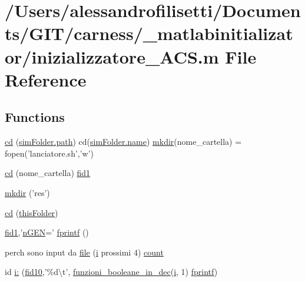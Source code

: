 \hypertarget{a00110}{\section{/\+Users/alessandrofilisetti/\+Documents/\+G\+I\+T/carness/\+\_\+matlabinitializator/inizializzatore\+\_\+\+A\+C\+S.m File Reference}
\label{a00110}
}
\subsection*{Functions}
\begin{DoxyCompactItemize}
\item 
\hyperlink{a00110_ab526c3939d1049806db989cf3095fc9a}{cd} (\hyperlink{a00113_af28466084b87af2cdc5c7b48f4661f2d}{sim\+Folder.\+path}) cd(\hyperlink{a00027_abbf559a76fab59203496b0847ab9502a}{sim\+Folder.\+name}) \hyperlink{a00110_ae58a11ed5ac7873b1039a391d5c86a05}{mkdir}(nome\+\_\+cartella) = fopen('lanciatore.\+sh','w')
\item 
\hyperlink{a00110_a778632868660bf2a5fb3a44735cfc066}{cd} (nome\+\_\+cartella) \hyperlink{a00028_ae941ef58ebac7f05a8095badde51c07b}{fid1}
\item 
\hyperlink{a00110_ae58a11ed5ac7873b1039a391d5c86a05}{mkdir} ('res')
\item 
\hyperlink{a00110_a767271ad82d244871370a0f0e6a7f8a4}{cd} (\hyperlink{a00113_a2d4125646b62462ce279d82913125ccf}{this\+Folder})
\item 
\hyperlink{a00028_ae941ef58ebac7f05a8095badde51c07b}{fid1},'\hyperlink{a00113_a4c8fe523edbe179c5d215da13f469f72}{n\+G\+E\+N}=' \hyperlink{a00110_aa6dc40efe43a338c9ff278260d95b4d9}{fprintf} ()
\item 
perch sono input da \hyperlink{a00110_a4e8353d6c62cf54bf4a1a8f63e56b8c3}{file} (\hyperlink{a00113_ad3efca1ea6e3333daf30719ee0501862}{i} prossimi 4) \hyperlink{a00110_aa0a4866d2600caeb20cfacee8eefc922}{count}
\item 
id \hyperlink{a00110_aab2a038840a8881d10ad04fd042040a6}{i\+:} (\hyperlink{a00110_aadad4fd2d661ea2b9f0c3a95e3f7b4ba}{fid10},'\%d\textbackslash{}t', \hyperlink{a00113_aca80ac3e93dabd95e623a51f90fb37b6}{funzioni\+\_\+booleane\+\_\+in\+\_\+dec}(\hyperlink{a00113_ad3efca1ea6e3333daf30719ee0501862}{i}, 1) \hyperlink{a00110_aa6dc40efe43a338c9ff278260d95b4d9}{fprintf})
\item 

\end{DoxyCompactItemize}
